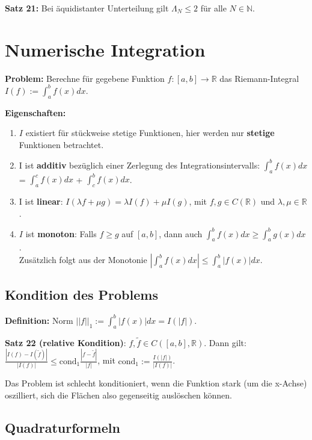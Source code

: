 \documentclass[a4paper]{article}
\begin{document}
\vspace{1em}

\textbf{Satz 21:} Bei äquidistanter Unterteilung gilt $\Lambda_N \le 2$ für alle
$N \in \mathbb{N}$.

\section{Numerische Integration}

\textbf{Problem:} Berechne für gegebene Funktion $f: [a, b] \to \mathbb{R}$ das
Riemann-Integral $I(f) := \int_a^b f(x) dx$.

\textbf{Eigenschaften:}
\begin{enumerate}
    \item $I$ existiert für stückweise stetige Funktionen, hier werden nur
    \textbf{stetige} Funktionen betrachtet.
    \item I ist \textbf{additiv} bezüglich einer Zerlegung des
    Integrationsintervalls: $\int_a^b f(x) dx$ = $\int_a^c f(x) dx$ + $\int_c^b
    f(x) dx$.
    \item I ist \textbf{linear}:
    $I(\lambda f + \mu g) = \lambda I(f) + \mu I(g)$, mit $f, g \in
    C(\mathbb{R})$ und $\lambda, \mu \in \mathbb{R}$.
    \item $I$ ist \textbf{monoton}: Falls $f \ge g$ auf $[a, b]$, dann auch
    $\int_a^b f(x) dx \ge \int_a^b g(x) dx$.
    \\
    Zusätzlich folgt aus der Monotonie
    $|\int_a^b f(x) dx| \le \int_a^b |f(x)| dx$.
\end{enumerate}

\subsection{Kondition des Problems}

\textbf{Definition:} Norm $||f||_1 := \int_a^b |f(x)| dx = I(|f|)$.

\textbf{Satz 22 (relative Kondition)}: $f, \tilde{f} \in C([a, b], \mathbb{R})$.
Dann gilt: $\frac{|I(f) - I(\tilde{f})|}{|I(f)|} \le \mathrm{cond}_1 \frac{|f -
\tilde{f}|}{|f|}$, mit $\mathrm{cond}_1 := \frac{I(|f|)}{|I(f)|}$.

Das Problem ist schlecht konditioniert, wenn die Funktion stark (um die x-Achse)
oszilliert, sich die Flächen also gegenseitig auslöschen können.

\subsection{Quadraturformeln}
\end{document}
